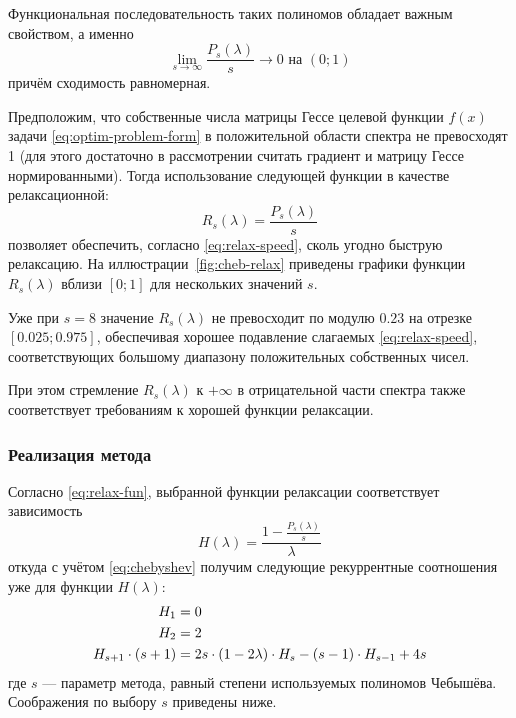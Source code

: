 Функциональная последовательность таких полиномов обладает важным
свойством, а именно
\begin{equation}
  \label{eq:cheb-limit}
  \lim_{s\to\infty}{\frac{P_s(\lambda)}{s}} \to 0 \text{ на } (0;1)
\end{equation}
причём сходимость равномерная.

Предположим, что собственные числа матрицы Гессе целевой функции
$f(x)$ задачи \eqref{eq:optim-problem-form} в положительной области
спектра не превосходят 1 (для этого достаточно в рассмотрении считать
градиент и матрицу Гессе нормированными). Тогда использование
следующей функции в качестве релаксационной:
\begin{equation}
  \label{eq:cheb-relax}
  R_s(\lambda) = \frac{P_s(\lambda)}{s}
\end{equation}
позволяет обеспечить, согласно \eqref{eq:relax-speed}, сколь угодно
быструю релаксацию. На иллюстрации \ref{fig:cheb-relax} приведены
графики функции $R_s(\lambda)$ вблизи $[0;1]$ для нескольких значений
$s$.



Уже при $s=8$ значение $R_s(\lambda)$ не превосходит по модулю $0.23$
на отрезке $[0.025; 0.975]$, обеспечивая хорошее подавление слагаемых
\eqref{eq:relax-speed}, соответствующих большому диапазону
положительных собственных чисел.

При этом стремление $R_s(\lambda)$ к $+\infty$ в
отрицательной части спектра также соответствует требованиям к хорошей
функции релаксации.

\subsubsection{Реализация метода}
Согласно \eqref{eq:relax-fun}, выбранной функции релаксации
соответствует зависимость
\begin{equation*}
  H(\lambda) = \frac{1-\frac{P_s(\lambda)}{s}}{\lambda}
\end{equation*}
откуда с учётом \eqref{eq:chebyshev} получим следующие рекуррентные
соотношения уже для функции $H(\lambda)$:
\begin{equation}
  \label{eq:cheb-scalarfun}
  \begin{aligned}
    H_1 &= 0 \\
    H_2 &= 2 \\
    H_{s+1} \cdot (s+1) &= 2s\cdot(1-2\lambda)\cdot H_s-(s-1)\cdot
    H_{s-1}+4s
  \end{aligned}
\end{equation}
где $s$ — параметр метода, равный степени используемых полиномов
Чебышёва. Соображения по выбору $s$ приведены ниже.

